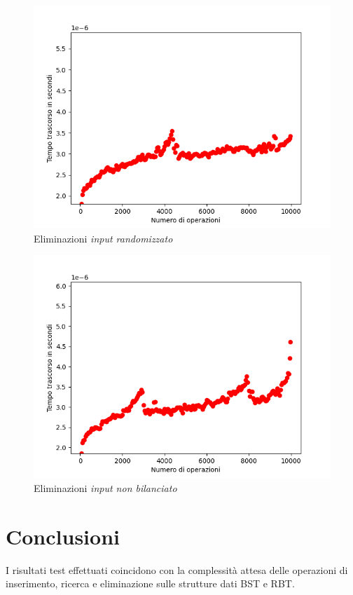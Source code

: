 \documentclass{article}
\begin{document}
			\begin{figure}[h!]
				\centering
				\includegraphics[scale = 0.8]{RBT_Deletions}
				\caption{Eliminazioni \textit{input randomizzato}}
			\end{figure}
			\begin{figure}[h!]
				\centering
				\includegraphics[scale = 0.8]{RBT_Unbalanced_Deletions}
				\caption{Eliminazioni \textit{input non bilanciato}}
			\end{figure}
		
		\clearpage

	\section{Conclusioni}
		I risultati test effettuati coincidono con la complessità attesa delle operazioni di inserimento, ricerca e eliminazione sulle strutture dati BST e RBT.
		
\end{document}
